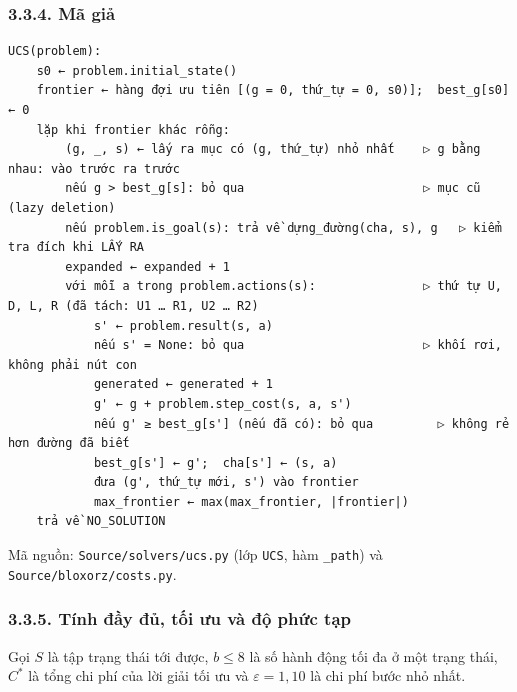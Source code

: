 \subsubsection{3.3.4. Mã giả}

\begin{verbatim}
UCS(problem):
    s0 ← problem.initial_state()
    frontier ← hàng đợi ưu tiên [(g = 0, thứ_tự = 0, s0)];  best_g[s0] ← 0
    lặp khi frontier khác rỗng:
        (g, _, s) ← lấy ra mục có (g, thứ_tự) nhỏ nhất    ▷ g bằng nhau: vào trước ra trước
        nếu g > best_g[s]: bỏ qua                         ▷ mục cũ (lazy deletion)
        nếu problem.is_goal(s): trả về dựng_đường(cha, s), g   ▷ kiểm tra đích khi LẤY RA
        expanded ← expanded + 1
        với mỗi a trong problem.actions(s):               ▷ thứ tự U, D, L, R (đã tách: U1 … R1, U2 … R2)
            s' ← problem.result(s, a)
            nếu s' = None: bỏ qua                         ▷ khối rơi, không phải nút con
            generated ← generated + 1
            g' ← g + problem.step_cost(s, a, s')
            nếu g' ≥ best_g[s'] (nếu đã có): bỏ qua         ▷ không rẻ hơn đường đã biết
            best_g[s'] ← g';  cha[s'] ← (s, a)
            đưa (g', thứ_tự mới, s') vào frontier
            max_frontier ← max(max_frontier, |frontier|)
    trả về NO_SOLUTION
\end{verbatim}

Mã nguồn: \texttt{Source/\allowbreak{}solvers/\allowbreak{}ucs.\allowbreak{}py} (lớp \texttt{UCS}, hàm \texttt{\_\allowbreak{}path}) và \texttt{Source/\allowbreak{}bloxorz/\allowbreak{}costs.\allowbreak{}py}.

\subsubsection{3.3.5. Tính đầy đủ, tối ưu và độ phức tạp}

Gọi \(S\) là tập trạng thái tới được, \(b \le 8\) là số hành động tối đa ở một trạng thái, \(C^*\) là tổng chi phí của lời giải tối ưu và \(\varepsilon = 1{,}10\) là chi phí bước nhỏ nhất.

